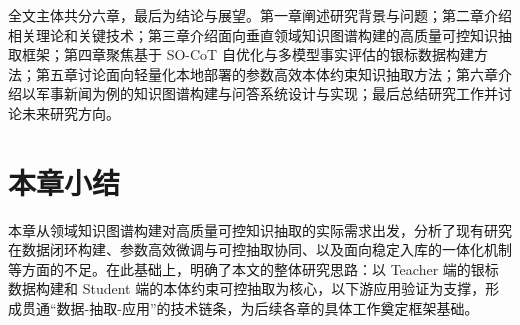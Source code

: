 全文主体共分六章，最后为结论与展望。第一章阐述研究背景与问题；第二章介绍相关理论和关键技术；第三章介绍面向垂直领域知识图谱构建的高质量可控知识抽取框架；第四章聚焦基于 SO-CoT 自优化与多模型事实评估的银标数据构建方法；第五章讨论面向轻量化本地部署的参数高效本体约束知识抽取方法；第六章介绍以军事新闻为例的知识图谱构建与问答系统设计与实现；最后总结研究工作并讨论未来研究方向。

\section{本章小结}

本章从领域知识图谱构建对高质量可控知识抽取的实际需求出发，分析了现有研究在数据闭环构建、参数高效微调与可控抽取协同、以及面向稳定入库的一体化机制等方面的不足。在此基础上，明确了本文的整体研究思路：以 Teacher 端的银标数据构建和 Student 端的本体约束可控抽取为核心，以下游应用验证为支撑，形成贯通“数据-抽取-应用”的技术链条，为后续各章的具体工作奠定框架基础。
